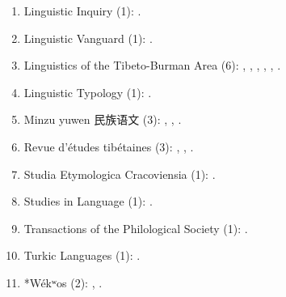 \documentclass[oneside,a4paper,11pt]{article}
\newcommand{\zh}[1]{{\cn #1}}
\begin{document}
\begin{enumerate}
 \item Linguistic Inquiry (1): \citet{antonov14need}.
 \item Linguistic Vanguard (1): \citet{jacques16th}.
 \item Linguistics of the Tibeto-Burman Area (6): \citet{jacques09wazur}, \citet{jacques13tropative}, \citet{jacques14linking}, \citet{jacques15spontaneous}, \citet{jacques16si}, \citet{jacques16complementation}.
 \item Linguistic Typology (1): \citet{jacques13harmonization}.
 \item Minzu yuwen \zh{民族语文} (3): \citet{jacques03s.houzhui}, \citet{jacques04redupl}, \citet{jacques08weiyu}.
 \item Revue d'études tibétaines (3): \citet{jacques07naksatram},  \citet{jacques08debther},   \citet{jacques10ndr}.
 \item Studia Etymologica Cracoviensia (1):  \citet{jacques13vama}.
  \item Studies in Language (1): \citet{jacques14auditory}.
  \item Transactions of the Philological Society (1):  \citet{jacques12internal}.
  \item Turkic Languages (1): \citet{antonov12kumush}.
\item *Wékʷos (2): \citet{jacques14honey}, \citet{jacques16camara}.
 \end{enumerate} 
 
\end{document}
